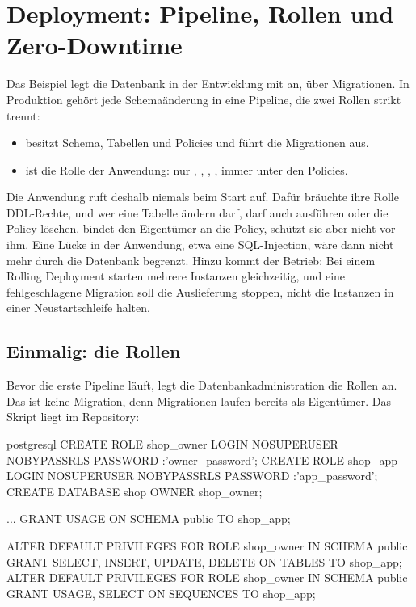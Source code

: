 \section{Deployment: Pipeline, Rollen und Zero-Downtime}\label{sec:deployment}

Das Beispiel  legt die Datenbank in der Entwicklung mit
 an,  über Migrationen. In Produktion gehört jede Schemaänderung in eine
Pipeline, die zwei Rollen strikt trennt:

\begin{itemize}
  \item \textbf{} besitzt Schema, Tabellen und Policies und führt
    die Migrationen aus.
  \item \textbf{} ist die Rolle der Anwendung: nur
    , , , , immer unter den Policies.
\end{itemize}

Die Anwendung ruft deshalb niemals
 beim Start auf. Dafür
bräuchte ihre Rolle DDL-Rechte, und wer eine Tabelle ändern darf, darf auch
 ausführen oder die Policy löschen.  bindet den
Eigentümer an die Policy, schützt sie aber nicht vor ihm. Eine Lücke in der Anwendung, etwa
eine SQL-Injection, wäre dann nicht mehr durch die Datenbank begrenzt. Hinzu kommt der Betrieb:
Bei einem Rolling Deployment starten mehrere Instanzen gleichzeitig, und eine fehlgeschlagene
Migration soll die Auslieferung stoppen, nicht die Instanzen in einer Neustartschleife halten.

\subsection*{Einmalig: die Rollen}

Bevor die erste Pipeline läuft, legt die Datenbankadministration die Rollen an. Das ist keine
Migration, denn Migrationen laufen bereits als Eigentümer. Das Skript liegt im Repository:

\begin{sourcecode}{postgresql}
CREATE ROLE shop_owner LOGIN NOSUPERUSER NOBYPASSRLS PASSWORD :'owner_password';
CREATE ROLE shop_app LOGIN NOSUPERUSER NOBYPASSRLS PASSWORD :'app_password';
CREATE DATABASE shop OWNER shop_owner;

...
GRANT USAGE ON SCHEMA public TO shop_app;

ALTER DEFAULT PRIVILEGES FOR ROLE shop_owner IN SCHEMA public
    GRANT SELECT, INSERT, UPDATE, DELETE ON TABLES TO shop_app;
ALTER DEFAULT PRIVILEGES FOR ROLE shop_owner IN SCHEMA public
    GRANT USAGE, SELECT ON SEQUENCES TO shop_app;
\end{sourcecode}

